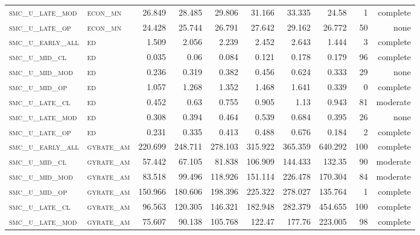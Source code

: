 \begin{landscape}
\begin{center}
\begin{footnotesize}
\begin{longtable}{llrrrrr|rrr}
\textsc{smc\_u\_late\_mod } & \textsc{econ\_mn  }   & 26.849   & 28.485   & 29.806   & 31.166   & 33.335   & 24.58    & 1   & complete \\
\textsc{smc\_u\_late\_op  } & \textsc{econ\_mn  }   & 24.428   & 25.744   & 26.791   & 27.642   & 29.162   & 26.772   & 50  & none     \\
\textsc{smc\_u\_early\_all} & \textsc{ed        }   & 1.509    & 2.056    & 2.239    & 2.452    & 2.643    & 1.444    & 3   & complete \\
\textsc{smc\_u\_mid\_cl   } & \textsc{ed        }   & 0.035    & 0.06     & 0.084    & 0.121    & 0.178    & 0.179    & 96  & complete \\
\textsc{smc\_u\_mid\_mod  } & \textsc{ed        }   & 0.236    & 0.319    & 0.382    & 0.456    & 0.624    & 0.333    & 29  & none     \\
\textsc{smc\_u\_mid\_op   } & \textsc{ed        }   & 1.057    & 1.268    & 1.352    & 1.468    & 1.641    & 0.339    & 0   & complete \\
\textsc{smc\_u\_late\_cl  } & \textsc{ed        }   & 0.452    & 0.63     & 0.755    & 0.905    & 1.13     & 0.943    & 81  & moderate \\
\textsc{smc\_u\_late\_mod } & \textsc{ed        }   & 0.308    & 0.394    & 0.464    & 0.539    & 0.684    & 0.395    & 26  & none     \\
\textsc{smc\_u\_late\_op  } & \textsc{ed        }   & 0.231    & 0.335    & 0.413    & 0.488    & 0.676    & 0.184    & 2   & complete \\
\textsc{smc\_u\_early\_all} & \textsc{gyrate\_am}   & 220.699  & 248.711  & 278.103  & 315.922  & 365.359  & 640.292  & 100 & complete \\
\textsc{smc\_u\_mid\_cl   } & \textsc{gyrate\_am}   & 57.442   & 67.105   & 81.838   & 106.909  & 144.433  & 132.35   & 90  & moderate \\
\textsc{smc\_u\_mid\_mod  } & \textsc{gyrate\_am}   & 83.518   & 99.496   & 118.926  & 151.114  & 226.478  & 170.304  & 84  & moderate \\
\textsc{smc\_u\_mid\_op   } & \textsc{gyrate\_am}   & 150.966  & 180.606  & 198.396  & 225.322  & 278.027  & 135.764  & 1   & complete \\
\textsc{smc\_u\_late\_cl  } & \textsc{gyrate\_am}   & 96.563   & 120.305  & 146.321  & 182.948  & 282.379  & 454.655  & 100 & complete \\
\textsc{smc\_u\_late\_mod } & \textsc{gyrate\_am}   & 75.607   & 90.138   & 105.768  & 122.47   & 177.76   & 223.005  & 98  & complete \\

\end{longtable}
\end{footnotesize}
\end{center}
\end{landscape}
